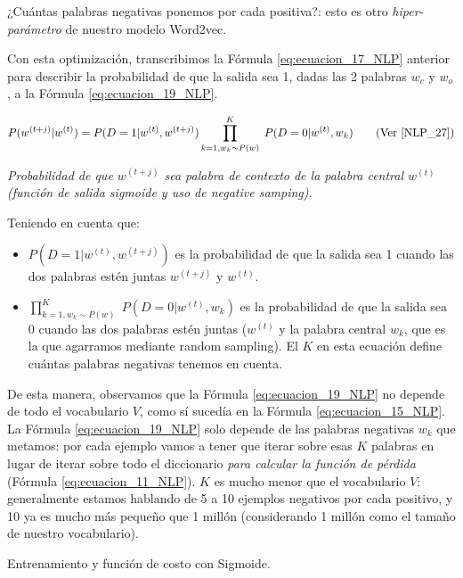 \documentclass[12pt,a4paper]{article}
\makeatletter
\renewcommand\paragraph{\@startsection{paragraph}{4}{\z@}
            {-2.5ex\@plus -1ex \@minus -.25ex}
            {1.25ex \@plus .25ex}
            {\normalfont\normalsize\bfseries}}
\makeatother
\begin{document}
\begin{sloppypar}
¿Cuántas palabras negativas ponemos por cada positiva?: esto es otro \textit{hiper-parámetro} de nuestro modelo Word2vec. 

Con esta optimización, transcribimos la Fórmula \ref{eq:ecuacion_17_NLP} anterior para describir la probabilidad de que la salida sea 1, dadas las 2 palabras $w_c$ y $w_o$, a la Fórmula \ref{eq:ecuacion_19_NLP}.

\begin{equation}\label{eq:ecuacion_19_NLP}
P(w^{(t+j)} | w^{(t)}) = P(D=1 | w^{(t)}, w^{(t+j)})  \prod_{k=1, w_k \sim P(w)}^{K} \; P(D=0 | w^{(t)}, w_k)     \qquad \text{(Ver \cite{NLP_27})}
\end{equation}
\begin{center}
\textit{Probabilidad de que $w^{(t+j)}$ sea palabra de contexto de la palabra central $w^{(t)}$ \\ (función de salida sigmoide y uso de negative samping)}.
\end{center}

Teniendo en cuenta que:
\begin{itemize}
\item $P(D=1 | w^{(t)}, w^{(t+j)})$ es la probabilidad de que la salida sea 1 cuando las dos palabras estén juntas $w^{(t+j)}$ y $w^{(t)}$.
\item $\prod_{k=1, w_k \sim P(w)}^{K} \; P(D=0 | w^{(t)}, w_k)$ es la probabilidad de que la salida sea 0 cuando las dos palabras estén juntas ($w^{(t)}$ y la palabra central $w_k$, que es la que agarramos mediante random sampling). El $K$ en esta ecuación define cuántas palabras negativas tenemos en cuenta. 
\end{itemize}

De esta manera, observamos que la Fórmula \ref{eq:ecuacion_19_NLP} no depende de todo el vocabulario $V$, como sí sucedía en la Fórmula \ref{eq:ecuacion_15_NLP}. La Fórmula \ref{eq:ecuacion_19_NLP} solo depende de las palabras negativas $w_k$ que metamos: por cada ejemplo vamos a tener que iterar sobre esas $K$ palabras en lugar de iterar sobre todo el diccionario \textit{para calcular la función de pérdida} (Fórmula \ref{eq:ecuacion_11_NLP}). $K$ es mucho menor que el vocabulario $V$: generalmente estamos hablando de 5 a 10 ejemplos negativos por cada positivo, y 10 ya es mucho más pequeño que 1 millón (considerando 1 millón como el tamaño de nuestro vocabulario).

\cleardoublepage

\paragraph{Entrenamiento y función de costo con Sigmoide.}\label{ent_costo_sigmoide}


\end{sloppypar}
\end{document}
